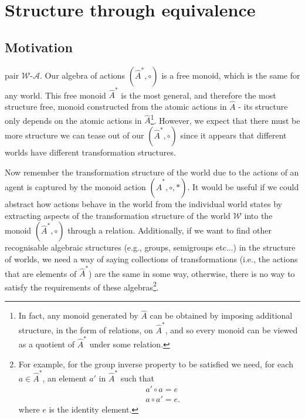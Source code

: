 \section{Structure through equivalence}
\subsection{Motivation}


 pair $\mathscr{W}$-$\mathscr{A}$.
Our algebra of actions $(\hat{A}^{\ast}, \circ)$ is a free monoid, which is the same for any world.
This free monoid $\hat{A}^{*}$ is the most general, and therefore the most structure free, monoid constructed from the atomic actions in $\hat{A}$ - its structure only depends on the atomic actions in $\hat{A}$\footnote{
In fact, any monoid generated by $\hat{A}$ can be obtained by imposing additional structure, in the form of relations, on $\hat{A}^{*}$, and so every monoid can be viewed as a quotient of $\hat{A}^{*}$ under some relation.
}.
However, we expect that there must be more structure we can tease out of our $(\hat{A}^{\ast}, \circ)$ since it appears that different worlds have different transformation structures.

Now remember the transformation structure of the world due to the actions of an agent is captured by the monoid action $(\hat{A}^{*}, \circ, \ast)$.
It would be useful if we could abstract how actions behave in the world from the individual world states by extracting aspects of the transformation structure of the world $\mathscr{W}$ into the monoid $(\hat{A}^{*}, \circ)$ through a relation.
Additionally, if we want to find other recognisable algebraic structures (e.g., groups, semigroups etc...) in the structure of worlds, we need a way of saying collections of transformations (i.e., the actions that are elements of $\hat{A}^{\ast}$) are the same in some way, otherwise, there is no way to satisfy the requirements of these algebras\footnote{
For example, for the group inverse property to be satisfied we need, for each $a \in \hat{A}^{\ast}$, an element $a'$ in $\hat{A}^{\ast}$ such that
\begin{align}
    & a' \circ a = e \\
    & a \circ a' = e.
\end{align}
where $e$ is the identity element.
}.

